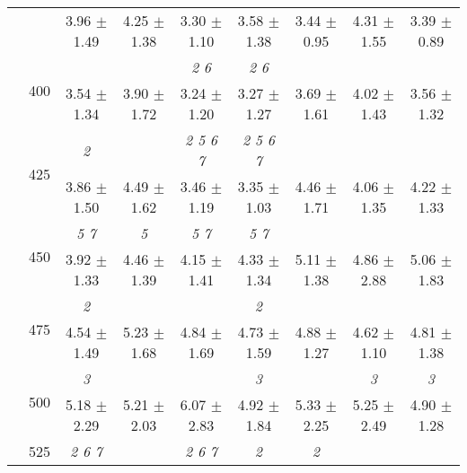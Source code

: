 \begin{table}[h]
{\begin{tabular}{
        ccccccccc}
 & & \cellcolor[HTML]{EFEFEF} 3.96 $\pm$ 1.49& \cellcolor[HTML]{EFEFEF} 4.25 $\pm$ 1.38& \cellcolor[HTML]{EFEFEF} 3.30 $\pm$ 1.10& \cellcolor[HTML]{EFEFEF} 3.58 $\pm$ 1.38& \cellcolor[HTML]{EFEFEF} 3.44 $\pm$ 0.95& \cellcolor[HTML]{EFEFEF} 4.31 $\pm$ 1.55& \cellcolor[HTML]{EFEFEF} 3.39 $\pm$ 0.89 \\ 
 & \multirow{2}{*}{400}& & & \textit{ 2 6 }& \textit{ 2 6 }& & &  \\ 
 & & 3.54 $\pm$ 1.34& 3.90 $\pm$ 1.72& 3.24 $\pm$ 1.20& 3.27 $\pm$ 1.27& 3.69 $\pm$ 1.61& 4.02 $\pm$ 1.43& 3.56 $\pm$ 1.32 \\ 
 & \multirow{2}{*}{425}& \cellcolor[HTML]{EFEFEF} \textit{ 2 }& \cellcolor[HTML]{EFEFEF} & \cellcolor[HTML]{EFEFEF} \textit{ 2 5 6 7 }& \cellcolor[HTML]{EFEFEF} \textit{ 2 5 6 7 }& \cellcolor[HTML]{EFEFEF} & \cellcolor[HTML]{EFEFEF} & \cellcolor[HTML]{EFEFEF}  \\ 
 & & \cellcolor[HTML]{EFEFEF} 3.86 $\pm$ 1.50& \cellcolor[HTML]{EFEFEF} 4.49 $\pm$ 1.62& \cellcolor[HTML]{EFEFEF} 3.46 $\pm$ 1.19& \cellcolor[HTML]{EFEFEF} 3.35 $\pm$ 1.03& \cellcolor[HTML]{EFEFEF} 4.46 $\pm$ 1.71& \cellcolor[HTML]{EFEFEF} 4.06 $\pm$ 1.35& \cellcolor[HTML]{EFEFEF} 4.22 $\pm$ 1.33 \\ 
 & \multirow{2}{*}{450}& \textit{ 5 7 }& \textit{ 5 }& \textit{ 5 7 }& \textit{ 5 7 }& & &  \\ 
 & & 3.92 $\pm$ 1.33& 4.46 $\pm$ 1.39& 4.15 $\pm$ 1.41& 4.33 $\pm$ 1.34& 5.11 $\pm$ 1.38& 4.86 $\pm$ 2.88& 5.06 $\pm$ 1.83 \\ 
 & \multirow{2}{*}{475}& \cellcolor[HTML]{EFEFEF} \textit{ 2 }& \cellcolor[HTML]{EFEFEF} & \cellcolor[HTML]{EFEFEF} & \cellcolor[HTML]{EFEFEF} \textit{ 2 }& \cellcolor[HTML]{EFEFEF} & \cellcolor[HTML]{EFEFEF} & \cellcolor[HTML]{EFEFEF}  \\ 
 & & \cellcolor[HTML]{EFEFEF} 4.54 $\pm$ 1.49& \cellcolor[HTML]{EFEFEF} 5.23 $\pm$ 1.68& \cellcolor[HTML]{EFEFEF} 4.84 $\pm$ 1.69& \cellcolor[HTML]{EFEFEF} 4.73 $\pm$ 1.59& \cellcolor[HTML]{EFEFEF} 4.88 $\pm$ 1.27& \cellcolor[HTML]{EFEFEF} 4.62 $\pm$ 1.10& \cellcolor[HTML]{EFEFEF} 4.81 $\pm$ 1.38 \\ 
 & \multirow{2}{*}{500}& \textit{ 3 }& & & \textit{ 3 }& & \textit{ 3 }& \textit{ 3 } \\ 
 & & 5.18 $\pm$ 2.29& 5.21 $\pm$ 2.03& 6.07 $\pm$ 2.83& 4.92 $\pm$ 1.84& 5.33 $\pm$ 2.25& 5.25 $\pm$ 2.49& 4.90 $\pm$ 1.28 \\ 
 & \multirow{2}{*}{525}& \cellcolor[HTML]{EFEFEF} \textit{ 2 6 7 }& \cellcolor[HTML]{EFEFEF} & \cellcolor[HTML]{EFEFEF} \textit{ 2 6 7 }& \cellcolor[HTML]{EFEFEF} \textit{ 2 }& \cellcolor[HTML]{EFEFEF} \textit{ 2 }& \cellcolor[HTML]{EFEFEF} & \cellcolor[HTML]{EFEFEF}  \\ 

\end{tabular}}
\end{table}
